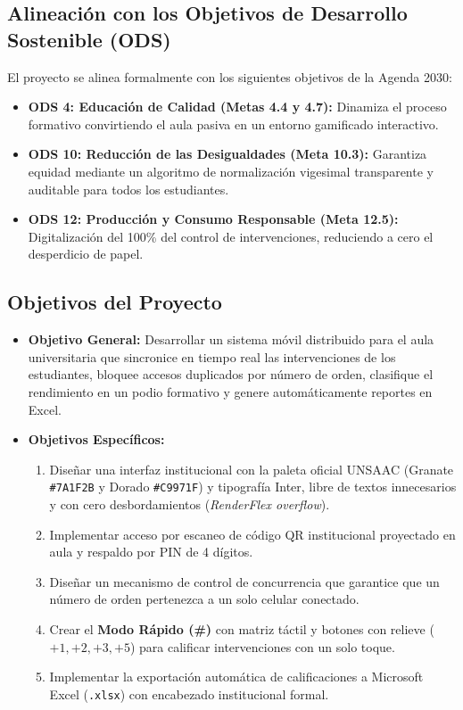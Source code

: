 \documentclass[12pt,a4paper]{article}
\begin{document}
\subsection{Alineación con los Objetivos de Desarrollo Sostenible (ODS)}
El proyecto se alinea formalmente con los siguientes objetivos de la Agenda 2030:
\begin{itemize}
    \item \textbf{ODS 4: Educación de Calidad (Metas 4.4 y 4.7):} Dinamiza el proceso formativo convirtiendo el aula pasiva en un entorno gamificado interactivo.
    \item \textbf{ODS 10: Reducción de las Desigualdades (Meta 10.3):} Garantiza equidad mediante un algoritmo de normalización vigesimal transparente y auditable para todos los estudiantes.
    \item \textbf{ODS 12: Producción y Consumo Responsable (Meta 12.5):} Digitalización del 100\% del control de intervenciones, reduciendo a cero el desperdicio de papel.
\end{itemize}

\subsection{Objetivos del Proyecto}
\begin{itemize}
    \item \textbf{Objetivo General:} Desarrollar un sistema móvil distribuido para el aula universitaria que sincronice en tiempo real las intervenciones de los estudiantes, bloquee accesos duplicados por número de orden, clasifique el rendimiento en un podio formativo y genere automáticamente reportes en Excel.
    \item \textbf{Objetivos Específicos:}
    \begin{enumerate}[noitemsep]
        \item Diseñar una interfaz institucional con la paleta oficial UNSAAC (Granate \texttt{\#7A1F2B} y Dorado \texttt{\#C9971F}) y tipografía Inter, libre de textos innecesarios y con cero desbordamientos (\textit{RenderFlex overflow}).
        \item Implementar acceso por escaneo de código QR institucional proyectado en aula y respaldo por PIN de 4 dígitos.
        \item Diseñar un mecanismo de control de concurrencia que garantice que un número de orden pertenezca a un solo celular conectado.
        \item Crear el \textbf{Modo Rápido (\#)} con matriz táctil y botones con relieve ($+1, +2, +3, +5$) para calificar intervenciones con un solo toque.
        \item Implementar la exportación automática de calificaciones a Microsoft Excel (\texttt{.xlsx}) con encabezado institucional formal.
    \end{enumerate}
\end{itemize}
\end{document}
